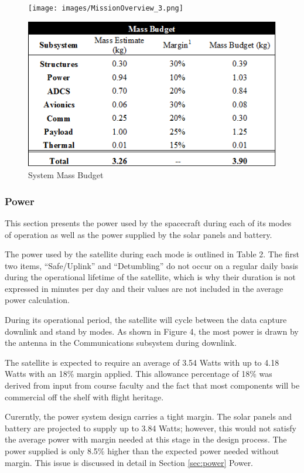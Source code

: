 \documentclass[12pt]{article}
\begin{document}
			\begin{figure}[!ht]
				\centering
				\texttt{[image: images/MissionOverview\_3.png]}
				
				\includegraphics[width=5in]{images/MissionOverview_5.png}
				\caption{System Mass Budget}
				\label{fig:Mission_mass2}
			\end{figure}
			
		\subsubsection{Power}
		This section presents the power used by the spacecraft during each of its modes of operation as well as the power supplied by the solar panels and battery. 

The power used by the satellite during each mode is outlined in Table 2. The first two items, “Safe/Uplink” and “Detumbling” do not occur on a regular daily basis during the operational lifetime of the satellite, which is why their duration is not expressed in minutes per day and their values are not included in the average power calculation. 

During its operational period, the satellite will cycle between the data capture downlink and stand by modes. As shown in Figure 4, the most power is drawn by the antenna in the Communications subsystem during downlink. 

The satellite is expected to require an average of 3.54 Watts with up to 4.18 Watts with an 18\% margin applied. This allowance percentage of 18\% was derived from input from course faculty and the fact that most components will be commercial off the shelf with flight heritage. 

Curerntly, the power system design carries a tight margin. The solar panels and battery are projected to supply up to 3.84 Watts; however, this would not satisfy the average power with margin needed at this stage in the design process. The power supplied is only 8.5\% higher than the expected power needed without margin. This issue is discussed in detail in Section \ref{sec:power} Power.
\end{document}
